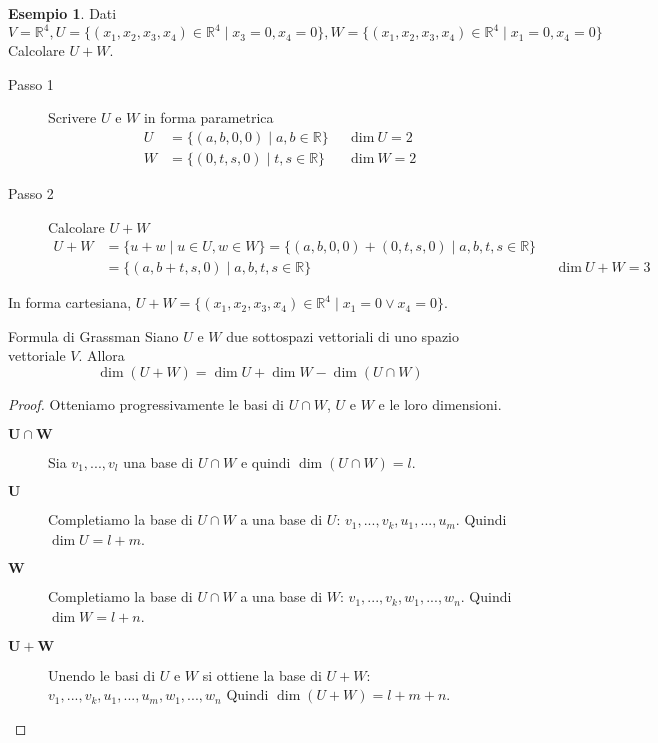 \documentclass[a4paper]{article}
\theoremstyle{definition}
\newtheorem*{es}{Esempio}
\begin{document}
\begin{es}
	Dati $V = \mathbb{R}^4, U = \{ (x_1, x_2, x_3, x_4) \in \mathbb{R}^4 \mid x_3 = 0, x_4 = 0 \}, W = \{ (x_1, x_2, x_3, x_4) \in \mathbb{R}^4 \mid x_1 = 0, x_4 = 0 \}$ \\
	Calcolare $U + W$.
	\begin{description}
		\item[Passo 1] Scrivere $U$ e $W$ in forma parametrica
		      \begin{align*}
			      U & = \{(a, b, 0, 0) \mid a, b \in \mathbb{R}\} &  & \text{dim} \ U = 2 \\
			      W & = \{(0, t, s, 0) \mid t, s \in \mathbb{R}\} &  & \text{dim} \ W = 2
		      \end{align*}
		\item[Passo 2] Calcolare $U + W$
		      \begin{align*}
			      U + W & = \{u + w \mid u \in U, w \in W\} = \{(a, b, 0, 0) + (0, t, s, 0) \mid a, b, t, s \in \mathbb{R}\}                             \\
			            & = \{(a, b + t, s, 0) \mid a, b, t, s \in \mathbb{R}\}                                              &  & \text{dim} \ U + W = 3
		      \end{align*}
	\end{description}
	In forma cartesiana, $U + W = \{(x_1, x_2, x_3, x_4) \in \mathbb{R}^4 \mid x_1 = 0 \lor x_4 = 0\}$.
\end{es}

\begin{teo}{Formula di Grassman}{}
	Siano $U$ e $W$ due sottospazi vettoriali di uno spazio vettoriale $V$. Allora
	\begin{equation*}
		\dim(U + W) = \dim U + \dim W - \dim(U \cap W)
	\end{equation*}
\end{teo}
\begin{proof}
	Otteniamo progressivamente le basi di $U \cap W$, $U$ e $W$ e le loro dimensioni.
	\begin{description}
		\item[$\mathbf{U \cap W}$] Sia $v_1, ..., v_l$ una base di $U \cap W$ e quindi $\dim(U \cap W) = l$.
		\item[$\mathbf{U}$] Completiamo la base di $U \cap W$ a una base di $U$: $v_1, ..., v_k, u_1, ..., u_m$.
		      Quindi $\dim U = l + m$.
		\item[$\mathbf{W}$] Completiamo la base di $U \cap W$ a una base di $W$: $v_1, ..., v_k, w_1, ..., w_n$.
			  Quindi $\dim W = l + n$.
		\item[$\mathbf{U + W}$] Unendo le basi di $U$ e $W$ si ottiene la base di $U + W$:$v_1, ..., v_k, u_1, ..., u_m, w_1, ..., w_n$
		      Quindi $\dim(U + W) = l + m + n$.
	\end{description}
\end{proof}
\end{document}
